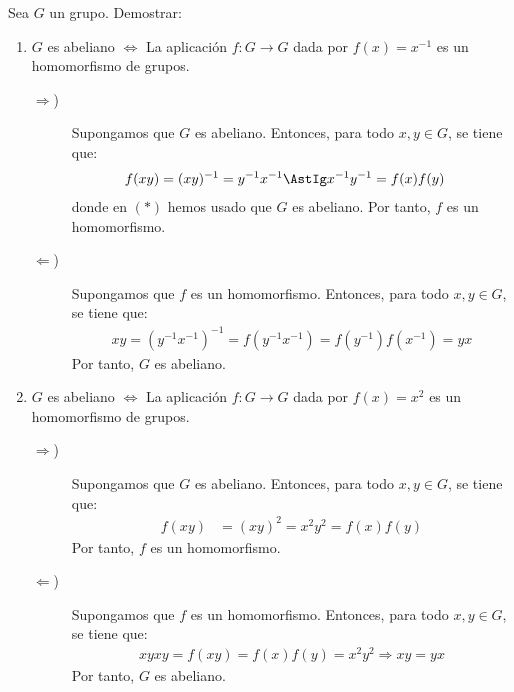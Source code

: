 \begin{ejercicio}\label{ej:2.37}
    Sea $G$ un grupo. Demostrar:
    \begin{enumerate}
        \item $G$ es abeliano $\iff$ La aplicación $f : G \to G$ dada por $f(x) = x^{-1}$ es un homomorfismo de grupos.
        \begin{description}
            \item[$\Longrightarrow$)] Supongamos que $G$ es abeliano. Entonces, para todo $x,y\in G$, se tiene que:
            \begin{align*}
                f(xy)&=(xy)^{-1}=y^{-1}x^{-1}\AstIg x^{-1}y^{-1}=f(x)f(y)
            \end{align*}
            donde en $(\ast)$ hemos usado que $G$ es abeliano. Por tanto, $f$ es un homomorfismo.

            \item[$\Longleftarrow$)] Supongamos que $f$ es un homomorfismo. Entonces, para todo $x,y\in G$, se tiene que:
            \begin{align*}
                xy=(y^{-1}x^{-1})^{-1}=f(y^{-1}x^{-1})=f(y^{-1})f(x^{-1})=yx
            \end{align*}
            Por tanto, $G$ es abeliano.
        \end{description}
        \item $G$ es abeliano $\iff$ La aplicación $f : G \to G$ dada por $f(x) = x^2$ es un homomorfismo de grupos.
        \begin{description}
            \item[$\Longrightarrow$)] Supongamos que $G$ es abeliano. Entonces, para todo $x,y\in G$, se tiene que:
            \begin{align*}
                f(xy)&=(xy)^2=x^2y^2=f(x)f(y)
            \end{align*}
            Por tanto, $f$ es un homomorfismo.

            \item[$\Longleftarrow$)] Supongamos que $f$ es un homomorfismo. Entonces, para todo $x,y\in G$, se tiene que:
            \begin{align*}
                xyxy=f(xy)=f(x)f(y)=x^2y^2\Longrightarrow xy=yx
            \end{align*}
            Por tanto, $G$ es abeliano.
        \end{description}
    \end{enumerate}
\end{ejercicio}


